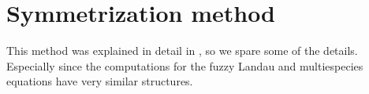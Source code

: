 \documentclass[10pt,oneside]{amsart}
\numberwithin{equation}{section}
\numberwithin{definition}{section}
\numberwithin{theorem}{section}
\numberwithin{lemma}{section}
\begin{document}


\section{Symmetrization method}\label{sec:symmetrization}
% 
This method was explained in detail in \cite{paper1}, so we spare some of the details. Especially since the computations for the fuzzy Landau and multiespecies equations have very similar structures. 

\end{document}

